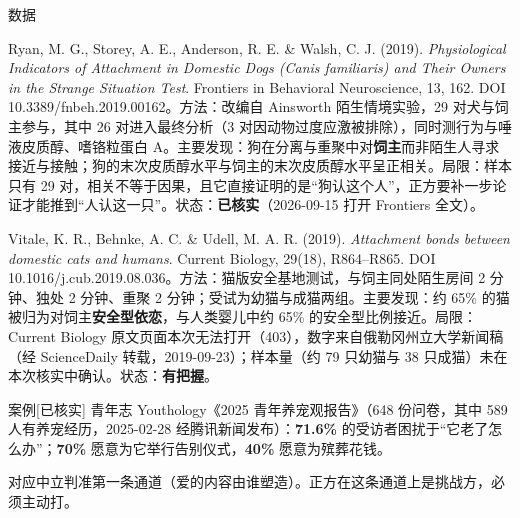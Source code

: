 \documentclass[prep,both]{debate}
\begin{document}
\begin{fields}
\begin{evidence}{数据}
\end{evidence}
\begin{bullets}
\item Ryan, M. G., Storey, A. E., Anderson, R. E. \& Walsh, C. J. (2019). \emph{Physiological Indicators of Attachment in Domestic Dogs (Canis familiaris) and Their Owners in the Strange Situation Test}. Frontiers in Behavioral Neuroscience, 13, 162. DOI 10.3389/fnbeh.2019.00162。方法：改编自 Ainsworth 陌生情境实验，29 对犬与饲主参与，其中 26 对进入最终分析（3 对因动物过度应激被排除），同时测行为与唾液皮质醇、嗜铬粒蛋白 A。主要发现：狗在分离与重聚中对\textbf{饲主}而非陌生人寻求接近与接触；狗的末次皮质醇水平与饲主的末次皮质醇水平呈正相关。局限：样本只有 29 对，相关不等于因果，且它直接证明的是“狗认这个人”，正方要补一步论证才能推到“人认这一只”。状态：\textbf{已核实}（2026-09-15 打开 Frontiers 全文）。
\item Vitale, K. R., Behnke, A. C. \& Udell, M. A. R. (2019). \emph{Attachment bonds between domestic cats and humans}. Current Biology, 29(18), R864–R865. DOI 10.1016/j.cub.2019.08.036。方法：猫版安全基地测试，与饲主同处陌生房间 2 分钟、独处 2 分钟、重聚 2 分钟；受试为幼猫与成猫两组。主要发现：约 65\% 的猫被归为对饲主\textbf{安全型依恋}，与人类婴儿中约 65\% 的安全型比例接近。局限：Current Biology 原文页面本次无法打开（403），数字来自俄勒冈州立大学新闻稿（经 ScienceDaily 转载，2019-09-23）；样本量（约 79 只幼猫与 38 只成猫）未在本次核实中确认。状态：\textbf{有把握}。
\end{bullets}
\begin{evidence}{案例}[已核实]
青年志 Youthology《2025 青年养宠观报告》（648 份问卷，其中 589 人有养宠经历，2025-02-28 经腾讯新闻发布）：\textbf{71.6\%} 的受访者困扰于“它老了怎么办”；\textbf{70\%} 愿意为它举行告别仪式，\textbf{40\%} 愿意为殡葬花钱。
\end{evidence}
\closing[回扣判准]{对应中立判准第一条通道（爱的内容由谁塑造）。正方在这条通道上是挑战方，必须主动打。}
\begin{clash}
\end{clash}
\end{fields}
\end{document}
